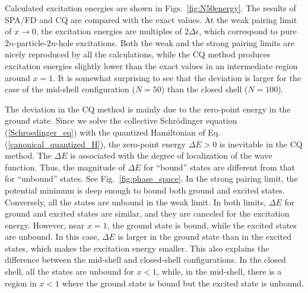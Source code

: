 \documentclass[%
superscriptaddress,
preprint,
showpacs,
nofootinbib,
amsmath,amssymb,
aps,
prc,
floatfix ]%
{revtex4-1}
\begin{document}
Calculated excitation energies are shown in Figs.~\ref{fig:N50energy}.
The results of SPA/FD and CQ are compared with the exact values.
At the weak pairing limit of $x\rightarrow 0$,
the excitation energies are multiples of $2\Delta\epsilon$, 
which correspond to pure $2n$-particle-$2n$-hole excitations.
Both the weak and the strong pairing limits
are nicely reproduced by all the calculations,
while the CQ method produces excitation energies slightly lower than the
exact values in an intermediate region around $x=1$.
It is somewhat surprising to see that the deviation is larger for
the case of the mid-shell configuration ($N=50$) than the closed shell
($N=100$).


The deviation in the CQ method is mainly due to the zero-point energy
in the ground state.
Since we solve the collective Schr\"odinger equation (\ref{Schroedinger_eq})
with the quantized Hamiltonian of Eq. (\ref{canonical_quantized_H}),
the zero-point energy $\Delta E>0$ is inevitable in the CQ method.
The $\Delta E$ is associated with the degree of localization of
the wave function.
Thus, the magnitude of $\Delta E$ for ``bound'' states are different
from that for ``unbound'' states.
See Fig.~\ref{fig:phase_space}.
In the strong pairing limit, the potential minimum is deep enough to bound
both ground and excited states.
Conversely, all the states are unbound in the weak limit.
In both limits, $\Delta E$ for ground and excited states are similar,
and they are canceled for the excitation energy.
However, near $x=1$, the ground state is bound,
while the excited states are unbound.
In this case, $\Delta E$ is larger in the ground state than in the
excited states, which makes the excitation energy smaller.
This also explains the difference between the mid-shell and closed-shell
configurations.
In the closed shell, all the states are unbound for $x<1$,
while, in the mid-shell,
there is a region in $x<1$ where the ground state is bound but
the excited state is unbound.
\end{document}
